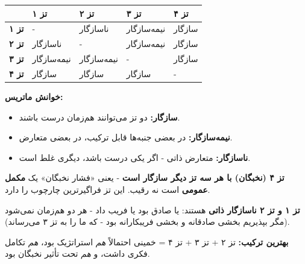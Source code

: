 \documentclass[12pt,a4paper]{book}
\newcommand{\keyword}[1]{\textbf{\textcolor{cPrimary}{#1}}}
\begin{document}
\begin{principleBox}
\begin{longtable}{%
    >{\centering\arraybackslash}p{}
    >{\centering\arraybackslash}p{}
    >{\centering\arraybackslash}p{}
    >{\centering\arraybackslash}p{}
    >{\centering\arraybackslash}p{}}
\toprule
\rowcolor{cPrimary!10}
& \cellcolor{cGreen!15}\textbf{تز ۱} & \cellcolor{cAccent!10}\textbf{تز ۲} & \cellcolor{cGold!15}\textbf{تز ۳} & \cellcolor{cConsolid!10}\textbf{تز ۴} \\
\midrule

\cellcolor{cGreen!15}\textbf{تز ۱} & - & \textcolor{cAccent}{ناسازگار} & \textcolor{cGold}{نیمه‌سازگار} & \textcolor{cGreen}{سازگار} \\
\midrule
\cellcolor{cAccent!10}\textbf{تز ۲} & \textcolor{cAccent}{ناسازگار} & - & \textcolor{cGold}{نیمه‌سازگار} & \textcolor{cGreen}{سازگار} \\
\midrule
\cellcolor{cGold!15}\textbf{تز ۳} & \textcolor{cGold}{نیمه‌سازگار} & \textcolor{cGold}{نیمه‌سازگار} & - & \textcolor{cGreen}{سازگار} \\
\midrule
\cellcolor{cConsolid!10}\textbf{تز ۴} & \textcolor{cGreen}{سازگار} & \textcolor{cGreen}{سازگار} & \textcolor{cGreen}{سازگار} & - \\

\bottomrule
\end{longtable}

\textbf{خوانش ماتریس:}
\begin{itemize}[label=\textcolor{cPrimary}{$\bullet$}, rightmargin=2em]
    \item \textcolor{cGreen}{\textbf{سازگار:}} دو تز می‌توانند هم‌زمان درست باشند.
    \item \textcolor{cGold}{\textbf{نیمه‌سازگار:}} در بعضی جنبه‌ها قابل ترکیب، در بعضی متعارض.
    \item \textcolor{cAccent}{\textbf{ناسازگار:}} متعارض ذاتی - اگر یکی درست باشد، دیگری غلط است.
\end{itemize}
\end{principleBox}

\begin{noteBox}
\keyword{تز ۴ (نخبگان) با هر سه تز دیگر سازگار است} - یعنی «فشار نخبگان» یک \keyword{مکمل عمومی} است نه رقیب. این تز فراگیرترین چارچوب را دارد.

\keyword{تز ۱ و تز ۲ ناسازگار ذاتی} هستند: یا صادق بود یا فریب داد - هر دو هم‌زمان نمی‌شود (مگر بپذیریم بخشی صادقانه و بخشی فریبکارانه بود - که ما را به تز ۳ می‌رساند).

\keyword{بهترین ترکیب:} تز ۲ + تز ۳ + تز ۴ = خمینی احتمالاً \textit{هم} استراتژیک بود، \textit{هم} تکامل فکری داشت، و \textit{هم} تحت تأثیر نخبگان بود.
\end{noteBox}
\end{document}
